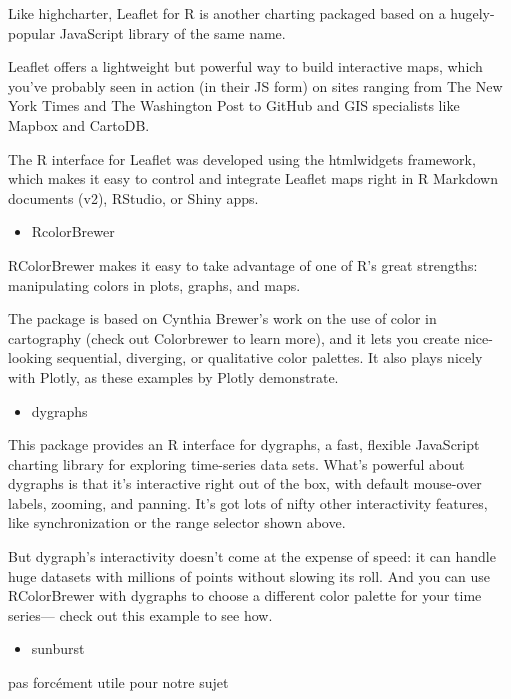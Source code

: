 \documentclass[
]{report}
\providecommand{\tightlist}{%
  \setlength{\itemsep}{0pt}\setlength{\parskip}{0pt}}
\begin{document}
Like highcharter, Leaflet for R is another charting packaged based on a hugely-popular JavaScript library of the same name.

Leaflet offers a lightweight but powerful way to build interactive maps, which you've probably seen in action (in their JS form) on sites ranging from The New York Times and The Washington Post to GitHub and GIS specialists like Mapbox and CartoDB.

The R interface for Leaflet was developed using the htmlwidgets framework, which makes it easy to control and integrate Leaflet maps right in R Markdown documents (v2), RStudio, or Shiny apps.

\begin{itemize}
\tightlist
\item
  RcolorBrewer
\end{itemize}

RColorBrewer makes it easy to take advantage of one of R's great strengths: manipulating colors in plots, graphs, and maps.

The package is based on Cynthia Brewer's work on the use of color in cartography (check out Colorbrewer to learn more), and it lets you create nice-looking sequential, diverging, or qualitative color palettes. It also plays nicely with Plotly, as these examples by Plotly demonstrate.

\begin{itemize}
\tightlist
\item
  dygraphs
\end{itemize}

This package provides an R interface for dygraphs, a fast, flexible JavaScript charting library for exploring time-series data sets. What's powerful about dygraphs is that it's interactive right out of the box, with default mouse-over labels, zooming, and panning. It's got lots of nifty other interactivity features, like synchronization or the range selector shown above.

But dygraph's interactivity doesn't come at the expense of speed: it can handle huge datasets with millions of points without slowing its roll. And you can use RColorBrewer with dygraphs to choose a different color palette for your time series--- check out this example to see how.

\begin{itemize}
\tightlist
\item
  sunburst
\end{itemize}

pas forcément utile pour notre sujet
\end{document}
